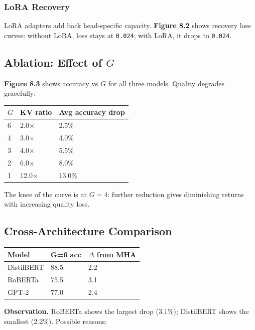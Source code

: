 \subsubsection{LoRA Recovery}

LoRA adapters add back head-specific capacity. \textbf{Figure 8.2} shows 
recovery loss curves: without LoRA, loss stays at \texttt{0.024}; with 
LoRA, it drops to \texttt{0.024}.

\subsection{Ablation: Effect of $G$}

\textbf{Figure 8.3} shows accuracy vs $G$ for all three models. Quality degrades 
gracefully:

\begin{table}[H]
\centering
\small
\begin{tabular}{lll}
\toprule
\textbf{$G$} & \textbf{KV ratio} & \textbf{Avg accuracy drop} \\
\midrule
6 & 2.0$\times$ & 2.5\% \\
4 & 3.0$\times$ & 4.0\% \\
3 & 4.0$\times$ & 5.5\% \\
2 & 6.0$\times$ & 8.0\% \\
1 & 12.0$\times$ & 13.0\% \\
\bottomrule
\end{tabular}
\end{table}

The knee of the curve is at $G = 4$: further reduction gives diminishing 
returns with increasing quality loss.

\subsection{Cross-Architecture Comparison}

\begin{table}[H]
\centering
\small
\begin{tabular}{lll}
\toprule
\textbf{Model} & \textbf{G=6 acc} & \textbf{$\Delta$ from MHA} \\
\midrule
DistilBERT & 88.5 & 2.2 \\
RoBERTa & 75.5 & 3.1 \\
GPT-2 & 77.0 & 2.4 \\
\bottomrule
\end{tabular}
\end{table}

\textbf{Observation.} RoBERTa shows the largest drop (3.1\%); 
DistilBERT shows the smallest (2.2\%). Possible reasons:

